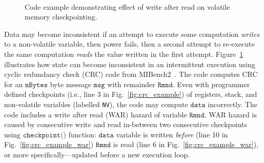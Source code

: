 \begin{figure}
	\centering
	\\
	\caption{Code example demonstrating effect of write after read on volatile memory checkpointing.}
	\label{fig:code_demo_incosistency}
\end{figure}

Data may become inconsistent if an attempt to execute some computation {\em writes} to a non-volatile variable, then power fails, then a second attempt to re-execute the same computation {\em reads} the value written in the first
attempt. Figure~\ref{fig:code_demo_incosistency} illustrates how state can become inconsistent in an intermittent execution using cyclic redundancy check (CRC) code from MIBench2~\cite{hicks_mibench2_2016}. The code computes CRC for an $\texttt{nBytes}$ byte message $\texttt{msg}$ with remainder $\texttt{Rmnd}$. Even with programmer defined checkpoints (i.e., line 3 in Fig.~\ref{fig:crc_example}) of registers, stack, and non-volatile variables (labelled \texttt{NV}), the code may compute $\texttt{data}$ incorrectly. The code includes a write after read (WAR) hazard of variable $\texttt{Rmnd}$. WAR hazard is caused by consecutive write and read in-between two consecutive checkpoints using $\texttt{checkpoint()}$ function: $\texttt{data}$ variable is written \emph{before} (line 10 in Fig.~\ref{fig:crc_example_war}) $\texttt{Rmnd}$ is read (line 6 in Fig.~\ref{fig:crc_example_war}), or more specifically---updated before a new execution loop. 

